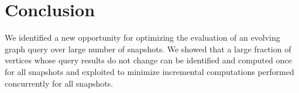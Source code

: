 
\section{Conclusion}
We identified a new opportunity for optimizing the evaluation of an evolving graph query over large number of snapshots. We showed that a large fraction of vertices whose query results do not change can be identified and computed once for all snapshots and exploited to minimize incremental computations performed concurrently for all snapshots. %

